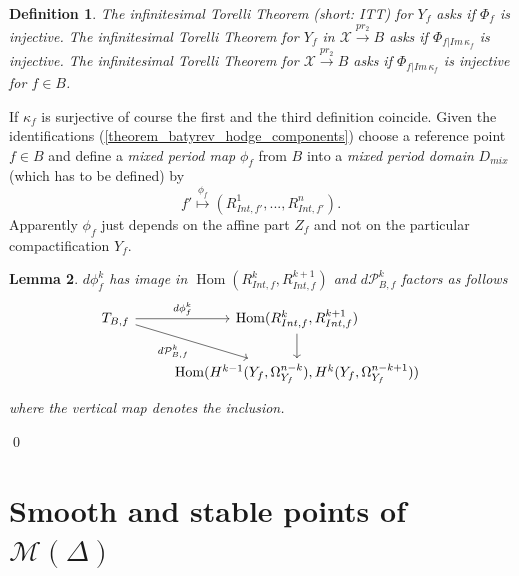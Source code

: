 \documentclass[12pt, english]{article}
\newtheorem{definition}{Definition}[section]
\newtheorem{lemma}[definition]{Lemma}
\DeclareMathOperator{\Hom}{Hom}
\begin{document}
\begin{definition}
	The infinitesimal Torelli Theorem (short: ITT) for $Y_f$ asks if $\Phi_f$ is injective. The infinitesimal Torelli Theorem for $Y_f$ in $\mathcal{X} \overset{pr_2}{\rightarrow} B$ asks if $\Phi_{f \vert{Im \, \kappa_f}}$ is injective. The infinitesimal Torelli Theorem for $\mathcal{X} \overset{pr_2}{\rightarrow} B$ asks if $\Phi_{f \vert{Im \, \kappa_f}}$ is injective for $f \in B$. 
\end{definition}


If $\kappa_f$ is surjective of course the first and the third definition coincide. Given the identifications (\ref{theorem_batyrev_hodge_components}) choose a reference point $f \in B$ and define a \textit{mixed period map} $\phi_f$ from $B$ into a \textit{mixed period domain} $D_{mix}$ (which has to be defined) by
\[ f' \overset{\phi_f}{\mapsto}  (R_{Int,f'}^1,..., R_{Int,f'}^{n}).  \]
Apparently $\phi_f$ just depends on the affine part $Z_f$ and not on the particular compactification $Y_f$. 
\leavevmode
\\


\begin{lemma} \label{lemma_diff_period_map_induces_hom_on_R_Int,f}
	$d \phi_f^k$ has image in $\Hom(R_{Int,f}^k, R_{Int,f}^{k+1})$ and $d \mathcal{P}_{B,f}^k$ factors as follows
	\begin{equation}
		\begin{tikzcd} \label{commutative_diagram_dP_B_mixed_period_map}
			T_{B,f}  \arrow[swap]{dr}{d \mathcal{P}_{B,f}^k } \arrow{r}{d \phi_f^k} & \Hom(R_{Int,f}^k, R_{Int,f}^{k+1})  \arrow{d} \\
			& \Hom(H^{k-1}(Y_f, \Omega_{Y_f}^{n-k}), H^k(Y_f, \Omega_{Y_f}^{n-k+1}))
		\end{tikzcd} 
	\end{equation}
	where the vertical map denotes the inclusion.
\end{lemma}
\qed








\section{Smooth and stable points of $\mathcal{M}(\Delta)$} \label{section_smooth_and_stable_points}
\end{document}
